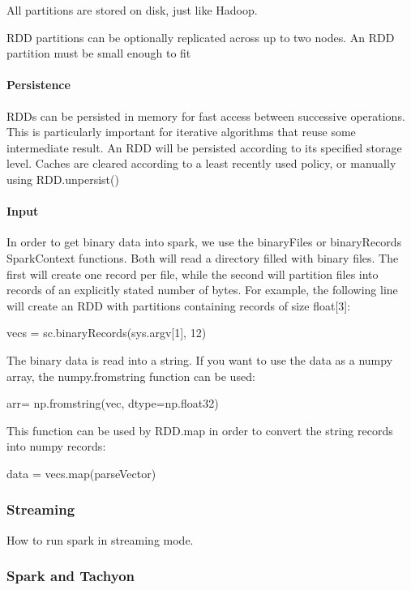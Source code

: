 All partitions are stored on disk, just like Hadoop.

RDD partitions can be optionally replicated across up to two nodes. An
RDD partition must be small enough to fit

\paragraph{Persistence}\label{persistence}

RDDs can be persisted in memory for fast access between successive
operations. This is particularly important for iterative algorithms that
reuse some intermediate result. An RDD will be persisted according to
its specified storage level. Caches are cleared according to a least
recently used policy, or manually using RDD.unpersist()

\paragraph{Input}\label{input}

In order to get binary data into spark, we use the binaryFiles or
binaryRecords SparkContext functions. Both will read a directory filled
with binary files. The first will create one record per file, while the
second will partition files into records of an explicitly stated number
of bytes. For example, the following line will create an RDD with
partitions containing records of size float{[}3{]}:

vecs = sc.binaryRecords(sys.argv{[}1{]}, 12)

The binary data is read into a string. If you want to use the data as a
numpy array, the numpy.fromstring function can be used:

arr= np.fromstring(vec, dtype=np.float32)

This function can be used by RDD.map in order to convert the string
records into numpy records:

data = vecs.map(parseVector)

\subsubsection{Streaming}\label{streaming-1}

How to run spark in streaming mode.

\subsubsection{Spark and Tachyon}\label{spark-and-tachyon}

